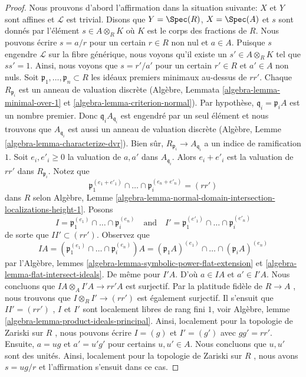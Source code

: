 \begin{proof}
\medskip\noindent
Nous prouvons d'abord l'affirmation dans la situation suivante:  $X$  et
 $Y$  sont affines et  $\mathcal{L}$  est trivial. Disons que  $Y = \Spec(R)$,
 $X = \Spec(A)$  et  $s$  sont donnés par l'élément  $s \in A \otimes_R K$  où
 $K$  est le corps des fractions de  $R$. Nous pouvons écrire
 $s = a/r$  pour un certain  $r \in R$  non nul et  $a \in A$. Puisque
 $s$  engendre  $\mathcal{L}$  sur la fibre générique, nous voyons qu'il
existe un  $s' \in A \otimes_R K$  tel que  $ss' = 1$. Ainsi, nous voyons que  $s = r'/a'$ 
pour un certain  $r' \in R$  et  $a' \in A$ non nuls. Soit  $\mathfrak p_1, \ldots, \mathfrak p_n \subset R$  les
idéaux premiers minimaux au-dessus de  $rr'$. Chaque  $R_{\mathfrak p_i}$  est un
anneau de valuation discrète (Algèbre, Lemmata  \ref{algebra-lemma-minimal-over-1}  et  \ref{algebra-lemma-criterion-normal}). Par
hypothèse,  $\mathfrak q_i = \mathfrak p_i A$  est un nombre premier. Donc  $\mathfrak q_i A_{\mathfrak q_i}$  est engendré par
un seul élément et nous trouvons que  $A_{\mathfrak q_i}$  est aussi un anneau de valuation
discrète (Algèbre, Lemme  \ref{algebra-lemma-characterize-dvr}). Bien sûr,  $R_{\mathfrak p_i} \to A_{\mathfrak q_i}$  a un indice de
ramification  $1$. Soit  $e_i, e'_i \geq 0$  la valuation de  $a, a'$  dans
 $A_{\mathfrak q_i}$. Alors  $e_i + e'_i$  est la valuation de  $rr'$  dans
 $R_{\mathfrak p_i}$. Notez que
$$
\mathfrak p_1^{(e_1 + e'_1)} \cap \ldots \cap \mathfrak p_i^{(e_n + e'_n)} =
(rr')
$$
dans  $R$  selon Algèbre, Lemme  \ref{algebra-lemma-normal-domain-intersection-localizations-height-1}. Posons
$$
I = \mathfrak p_1^{(e_1)} \cap \ldots \cap \mathfrak p_i^{(e_n)}
\quad\text{and}\quad
I' = \mathfrak p_1^{(e'_1)} \cap \ldots \cap \mathfrak p_i^{(e'_n)}
$$
de sorte que  $II' \subset (rr')$. Observez que
$$
IA =
(\mathfrak p_1^{(e_1)} \cap \ldots \cap \mathfrak p_i^{(e_n)})A =
(\mathfrak p_1A)^{(e_1)} \cap \ldots \cap (\mathfrak p_i A)^{(e_n)}
$$
par l'Algèbre, lemmes  \ref{algebra-lemma-symbolic-power-flat-extension}  et  \ref{algebra-lemma-flat-intersect-ideals}. De même pour  $I'A$.
D'où  $a \in IA$  et  $a' \in I'A$. Nous concluons que  $IA \otimes_A I'A \to rr'A$  est surjectif.
Par la platitude fidèle de  $R \to A$ , nous trouvons que  $I \otimes_R I' \to (rr')$  est
également surjectif. Il s'ensuit que  $II' = (rr')$ ,  $I$  et  $I'$ 
sont localement libres de rang fini  $1$, voir Algèbre, lemme
 \ref{algebra-lemma-product-ideals-principal}. Ainsi, localement pour la topologie de Zariski sur  $R$ ,
nous pouvons écrire  $I = (g)$  et  $I' = (g')$  avec  $gg' = rr'$. Ensuite,
 $a = ug$  et  $a' = u'g'$  pour certains  $u, u' \in A$. Nous concluons que
 $u, u'$  sont des unités. Ainsi, localement pour la topologie de Zariski sur
 $R$ , nous avons  $s = ug/r$  et l'affirmation s'ensuit dans ce cas.


\end{proof}
